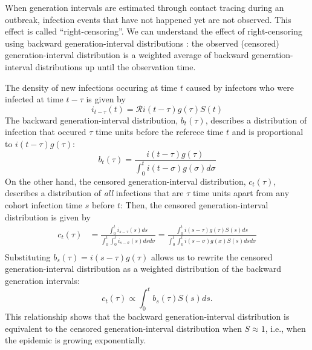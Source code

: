 \documentclass[12pt]{article}
\newcommand{\RR}{\ensuremath{{\mathcal R}}}
\newcommand{\comment}[3]{\textcolor{#1}{\textbf{[#2: }\textsl{#3}\textbf{]}}}
\newcommand{\dc}[1]{\comment{blue}{DC}{#1}}
\begin{document}
When generation intervals are estimated through contact tracing during an outbreak, infection events that have not happened yet are not observed. 
This effect is called ``right-censoring''.
We can understand the effect of right-censoring using backward generation-interval distributions \citep{tomba2010some, nishiura2010time, champredon2015intrinsic, britton2019estimation}:
the observed (censored) generation-interval distribution is a weighted average of backward generation-interval distributions up until the observation time.


The density of new infections occuring at time $t$ caused by infectors who were infected at time $t-\tau$ is given by
\begin{equation}
i_{t-\tau}(t) = \RR i(t-\tau) g(\tau) S(t)
\end{equation}
The backward generation-interval distribution, $b_t(\tau)$, describes a distribution of infection that occured $\tau$ time units before the referece time $t$ and is proportional to $i(t-\tau) g(\tau)$:
\begin{equation}
b_t(\tau) = \frac{i(t-\tau) g(\tau)}{\int_0^t i(t-\sigma) g(\sigma) d\sigma}
\end{equation}
On the other hand, the censored generation-interval distribution, $c_t(\tau)$, describes a distribution of \emph{all} infections that are $\tau$ time units apart from any cohort infection time $s$ before $t$:
Then, the censored generation-interval distribution is given by
\begin{equation}\label{eq:obsg}
\begin{aligned}
c_t(\tau) 
&= \frac{\int_0^t i_{s-\tau}(s) ds}{\int_0^t \int_0^t i_{s-\sigma}(s) ds d\sigma}= \frac{\int_0^t i(s-\tau) g(\tau) S(s) ds}{\int_0^t \int_0^t i(s-\sigma) g(x) S(s) ds d\sigma}\\
\end{aligned}
\end{equation}
Substituting $b_s(\tau) = i(s-\tau) g(\tau)$ allows us to rewrite the censored generation-interval distribution as a weighted distribution of the backward generation intervals:
\begin{equation}
c_t(\tau) \propto \int_0^t b_s(\tau) S(s) ds.
\end{equation}
This relationship shows that the backward generation-interval distribution is equivalent to the censored generation-interval distribution when $S \approx 1$, i.e., when the epidemic is growing exponentially.
\end{document}
